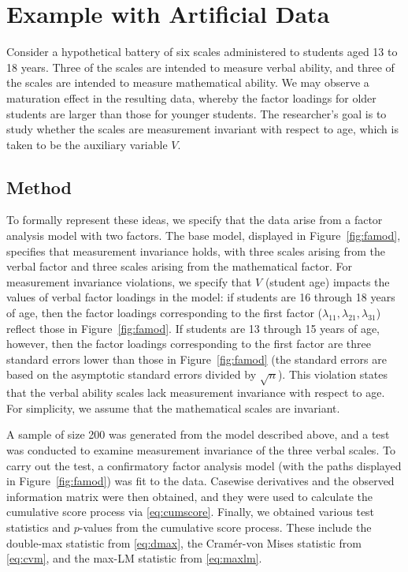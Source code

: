 \documentclass[man]{apa}
\begin{document}
\section{Example with Artificial Data}

Consider a 
hypothetical battery of six scales administered to students aged 13 to 18
years.  Three of the scales are intended to measure verbal ability, and
three of the scales are intended to measure mathematical ability.  We
may observe a maturation effect in the resulting data, whereby the
factor loadings for older students are larger than those for younger
students.  The researcher's goal is to
study whether the scales are measurement invariant with
respect to age, which is taken to be the auxiliary variable $V$.



\subsection{Method}

To formally represent these ideas, we specify that the data arise from
a factor analysis model with two factors.  The base model, displayed in
Figure~\ref{fig:famod}, specifies that measurement invariance holds,
with three scales arising from the verbal factor and three 
scales arising from the mathematical factor.
For measurement invariance violations, we specify that $V$
(student age) impacts the values of 
verbal factor loadings in the model: 
if students are 16 through 18 years of age, then the factor
loadings corresponding to the first 
factor ($\lambda_{11}, \lambda_{21}, \lambda_{31}$) reflect those in
Figure~\ref{fig:famod}.  If students are 13 through 15 years of age,
however, then the factor loadings corresponding to the first factor
are three standard errors lower than those in Figure~\ref{fig:famod}
(the standard errors are based on the asymptotic standard errors
divided by $\sqrt{n}$).
This violation states that the verbal ability scales
lack measurement invariance with respect to age.  For simplicity, we
assume that the mathematical scales are invariant.



A sample of size 200 was generated from the model described above, and
a test was conducted to examine measurement invariance of the three
verbal scales.  To carry out
the test, a confirmatory factor analysis model (with the paths
displayed in Figure~\ref{fig:famod}) was fit to the
data.  Casewise derivatives and 
the observed information matrix were then obtained, and they were used
to calculate the cumulative score process via
\eqref{eq:cumscore}.  Finally, we
obtained various test statistics and $p$-values from the cumulative score
process.  These include the double-max statistic from \eqref{eq:dmax},
the Cram\'{e}r-von Mises statistic from \eqref{eq:cvm}, and the max-LM
statistic from \eqref{eq:maxlm}.
\end{document}
